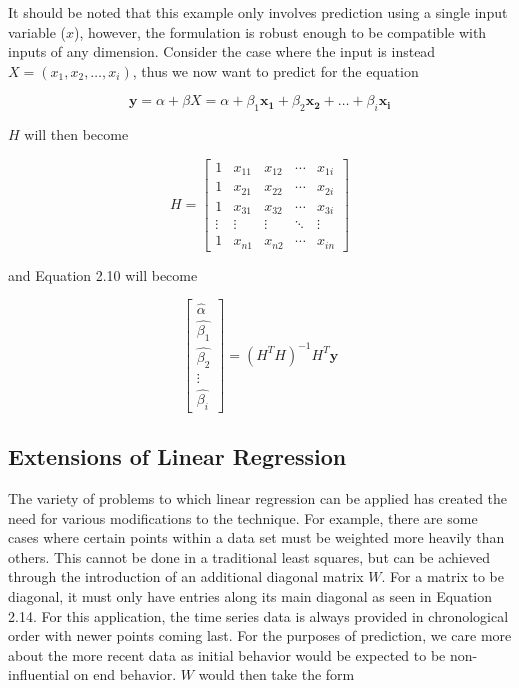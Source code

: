 It should be noted that this example only involves prediction using a single input variable ($x$), however, the formulation is robust enough to be compatible with inputs of any dimension. Consider the case where the input is instead $X = (x_{1}, x_{2}, \hdots, x_{i})$, thus we now want to predict for the equation

\begin{equation}
    \bm{y} = \alpha + \beta X = \alpha + \beta_{1}\bm{x_{1}} + \beta_{2}\bm{x_{2}} + \hdots + \beta_{i}\bm{x_{i}}
\end{equation}

$H$ will then become 

\begin{equation}
H
=
\begin{bmatrix}
1 & x_{11} & x_{12} & \cdots & x_{1i} \\
1 & x_{21} & x_{22} & \cdots & x_{2i} \\
1 & x_{31} & x_{32} & \cdots & x_{3i} \\
\vdots & \vdots & \vdots & \ddots & \vdots \\
1 & x_{n1} & x_{n2} & \cdots & x_{in}
\end{bmatrix}
\end{equation}

and Equation 2.10 will become

\begin{equation}
\begin{bmatrix}
\hat{\alpha} \\
\hat{\beta_{1}} \\
\hat{\beta_{2}} \\
\vdots \\
\hat{\beta_{i}}
\end{bmatrix}
=
(H^{T}H)^{-1}H^{T}\bm{y}
\end{equation}

\subsection{Extensions of Linear Regression}

The variety of problems to which linear regression can be applied has created the need for various modifications to the technique. For example, there are some cases where certain points within a data set must be weighted more heavily than others. This cannot be done in a traditional least squares, but can be achieved through the introduction of an additional diagonal matrix $W$. For a matrix to be diagonal, it must only have entries along its main diagonal as seen in Equation 2.14. For this application, the time series data is always provided in chronological order with newer points coming last. For the purposes of prediction, we care more about the more recent data as initial behavior would be expected to be non-influential on end behavior. $W$ would then take the form

